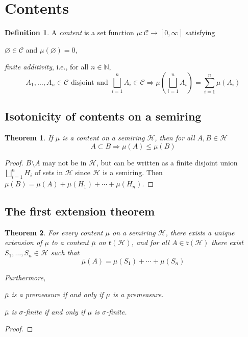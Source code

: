 \documentclass[11pt, a4paper, openany]{book}
\newtheorem{thm}{Theorem}\newtheorem{lem}{Lemma}\newtheorem{crl}{Corollary}
\theoremstyle{definition}
\newtheorem{define}{Definition}\newtheorem{exam}{Example}\newtheorem{remark}{Remark}
\newenvironment{tight_enumerate}{\begin{enumerate}\itemsep -0.2em}{\end{enumerate}}
\begin{document}
\section{Contents}
    \begin{define}
        A \textit{content} is a set function $\mu:\mathscr{C}\rightarrow [0,\infty]$ satisfying
        \begin{tight_enumerate}
            \item $\varnothing\in\mathscr{C}$ and $\mu(\varnothing)=0$,
            \item \textit{finite additivity}, i.e., for all $n\in\mathbb{N}$,
            \[
                A_1,\dots,A_n\in\mathscr{C}\text{ disjoint and }\bigsqcup_{i=1}^nA_i\in\mathscr{C}\Longrightarrow \mu\left(\bigsqcup_{i=1}^nA_i\right)=\sum_{i=1}^n\mu(A_i)
            \]
        \end{tight_enumerate}
    \end{define}
\subsection{Isotonicity of contents on a semiring}
    \begin{thm}\label{monotonicity of a content on a semiring}
        If $\mu$ is a content on a semiring $\mathscr{H}$, then for all $A,B\in\mathscr{H}$
        \[A\subset B\Longrightarrow \mu(A)\leqslant\mu(B)\]
    \end{thm}
    \begin{proof}
        $B\setminus A$ may not be in $\mathscr{H}$, but can be written as a finite disjoint union $\bigsqcup_{i=1}^n H_i$ of sets in $\mathscr{H}$ since $\mathscr{H}$ is a semiring. Then $\mu(B)=\mu(A)+\mu(H_1)+\cdots+\mu(H_n)$.
    \end{proof}
\subsection{The first extension theorem}
    \begin{thm}\label{first extension theorem}
        For every content $\mu$ on a semiring $\mathscr{H}$, there exists a unique extension of $\mu$ to a content $\overline{\mu}$ on $\mathfrak{r}(\mathscr{H})$, and for all $A\in \mathfrak{r}(\mathscr{H})$ there exist $S_1,\dots,S_n\in\mathscr{H}$ such that
        \[
          \overline{\mu}(A)=\mu(S_1)+\cdots+\mu(S_n)  
        \]
        
        Furthermore, 
        \begin{tight_enumerate}
            \item $\overline{\mu}$ is a premeasure if and only if $\mu$ is a premeasure.
            \item $\overline{\mu}$ is $\sigma$-finite if and only if $\mu$ is $\sigma$-finite.
        \end{tight_enumerate}
    \end{thm}
    \begin{proof}

    \end{proof}
\end{document}
